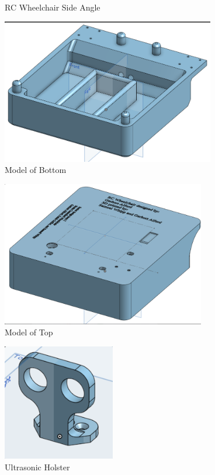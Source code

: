 \documentclass[conference]{IEEEtran}
\begin{document}
\begin{figure}[h]
    \caption{RC Wheelchair Side Angle}
    \label{fig:rc1}
\end{figure}\begin{figure}[h]
    \centering
    \includegraphics[keepaspectratio, height=2.5in]{figs/H/rcmod0.png}
    \caption{Model of Bottom}
    \label{fig:rcmod0}
\end{figure}\begin{figure}[h]
    \centering
    \includegraphics[keepaspectratio, height=2.5in]{figs/H/rcmod1.png}
    \caption{Model of Top}
    \label{fig:rcmod1}
\end{figure}\begin{figure}[h]
    \centering
    \includegraphics[keepaspectratio, height=2in]{figs/H/rcmod2.png}
    \caption{Ultrasonic Holster}
    \label{fig:rcmod2}
\end{figure}\begin{figure}[h]

\end{figure}
\end{document}

